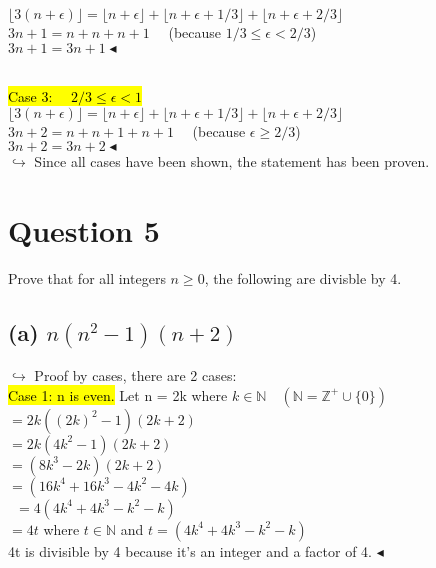 \documentclass[a4paper, 12pt]{article}
\begin{document}
$\lfloor 3(n + \epsilon) \rfloor = \lfloor n + \epsilon \rfloor + \lfloor n + \epsilon + 1/3 \rfloor + \lfloor n + \epsilon + 2/3 \rfloor$\\

$3n +1= n+n+n+1 \quad$ (because $1/3 \leq \epsilon < 2/3$)\\
$3n+1= 3n+1 \blacktriangleleft$\\\

\hl{Case 3: $\quad 2/3 \leq \epsilon < 1$}\\

$\lfloor 3(n + \epsilon) \rfloor = \lfloor n + \epsilon \rfloor + \lfloor n + \epsilon + 1/3 \rfloor + \lfloor n + \epsilon + 2/3 \rfloor$\\

$3n+2 = n+n+1+n+1 \quad$ (because $\epsilon \geq 2/3$)\\
$3n+2=3n+2 \blacktriangleleft$\\

$\hookrightarrow$ Since all cases have been shown, the statement has been proven.

\section*{Question 5}

Prove that for all integers $n \geq 0$, the following are divisble by 4.

\subsection*{(a) $n(n^2-1)(n+2)$}

$\hookrightarrow$ Proof by cases,  there are 2 cases:\\

\hl{Case 1: n is even.} Let n = 2k where $k \in \mathbb{N} \quad (\mathbb{N} = \mathbb{Z^+} \cup \{0\})$\\

$=2k((2k)^2-1)(2k+2)$\\
$=2k(4k^2-1)(2k+2)$\\
$=(8k^3-2k)(2k+2)$\\
$=(16k^4+16k^3-4k^2-4k)$\\\
$=4(4k^4+4k^3-k^2-k)$\\
$=4t$ where $t \in \mathbb{N}$ and $t=(4k^4+4k^3-k^2-k)$\\

4t is divisible by 4 because it's an integer and a factor of 4. $\blacktriangleleft$\\
\end{document}
